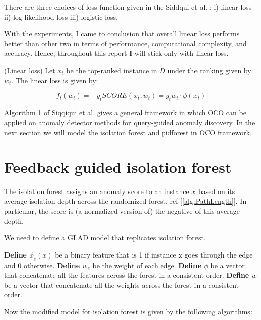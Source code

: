 There are three choices of loss function given in the Siddqui et al. \cite{10.1145/3219819.3220083}: i) linear loss ii) log-likelihood loss iii) logistic loss. 

With the experiments, I came to conclusion that overall linear loss performs better than other two in terms of performance, computational complexity, and accuracy.
Hence, throughout this report I will stick only with linear loss.

\begin{defn}
    \label{defn:linear-loss}
    (Linear loss)
    Let $x_t$ be the top-ranked instance in $D$ under the ranking given by $w_t$.
    The linear loss is given by:

    \vspace{-2em}
    \begin{equation}
        \label{eq:linear-loss}
        f_t(w_t) = -y_t SCORE(x_t;w_t) = y_t w_t \cdot \phi (x_t)
    \end{equation}
\end{defn}

Algorithm 1 of Siqqiqui et al. \cite{10.1145/3219819.3220083} gives a general framework in which OCO can be applied on anomaly detector methods for query-guided anomaly discovery.
In the next section we will model the isolation forest and pidforest in OCO framework.


\section{Feedback guided isolation forest}
\label{sec:feedback-guided-iforest}

The isolation forest assigns an anomaly score to an instance $x$ based on its average isolation depth across the randomized forest, ref [\ref{alg:PathLength}].
In particular, the score is (a normalized version of) the negative of
this average depth.

We need to define a GLAD model that replicates isolation forest.

\textbf{Define $\phi_e(x)$} be a binary feature that is 1 if instance x goes through the edge and 0 otherwise.
\textbf{Define $w_e$} be the weight of each edge.
\textbf{Define $\phi$}  be a vector that concatenate all the features across the forest in a consistent order.
\textbf{Define $w$}  be a vector that concatenate all the weights across the forest in a consistent order.

Now the modified model for isolation forest is given by the following algorithms:

